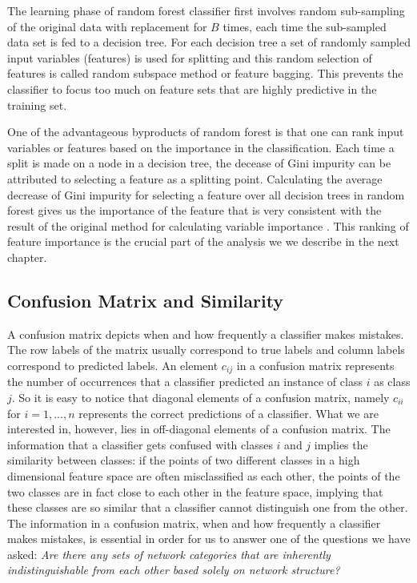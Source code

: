 The learning phase of random forest classifier first involves random sub-sampling of the original data with replacement for $B$ times, each time the sub-sampled data set is fed to a decision tree. For each decision tree a set of randomly sampled input variables (features) is used for splitting and this random selection of features is called random subspace method or feature bagging. This prevents the classifier to focus too much on feature sets that are highly predictive in the training set. 

One of the advantageous byproducts of random forest is that one can rank input variables or features based on the importance in the classification. Each time a split is made on a node in a decision tree, the decease of Gini impurity can be attributed to selecting a feature as a splitting point.  Calculating the average decrease of Gini impurity for selecting a feature over all decision trees in random forest gives us the importance of the feature that is very consistent with the result of the original method for calculating variable importance \cite{RandomForest,RandomForestOnline}. This ranking of feature importance is the crucial part of the analysis we we describe in the next chapter.


		\subsection{Confusion Matrix and Similarity}
	A confusion matrix depicts when and how frequently a classifier makes mistakes. The row labels of the matrix usually correspond to  true labels and column labels correspond to predicted labels. An element $c_{ij}$ in a confusion matrix represents the number of occurrences that a classifier predicted an instance of class $i$ as class $j$. So it is easy to notice that diagonal elements of a confusion matrix, namely $c_{ii}$ for $i = 1,...,n$ represents the correct predictions of a classifier. What we are interested in, however, lies in off-diagonal elements of a confusion matrix. The information that a classifier gets confused with classes $i$ and $j$ implies the similarity between classes: if the points of two different classes in a high dimensional feature space are often misclassified as each other, the points of the two classes are in fact close to each other in the feature space, implying that these classes are so similar that a classifier cannot distinguish one from the other. The information in a confusion matrix, when and how frequently a classifier makes mistakes, is essential in order for us to answer one of the questions we have asked: \textit{Are there any sets of network categories that are inherently indistinguishable from each other based solely on network structure?}

